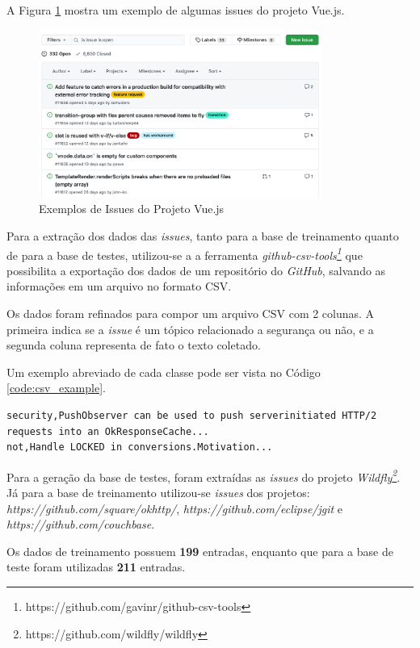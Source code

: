 \documentclass[conference]{IEEEtran}
\begin{document}
A Figura \ref{fig:issues_example} mostra um exemplo de algumas issues do projeto Vue.js.

\begin{figure}[htbp]
    \centerline{\includegraphics[width=25em]{images/issues_example.png}}
    \caption{Exemplos de Issues do Projeto Vue.js}
    \label{fig:issues_example}
\end{figure}

Para a extração dos dados das \textit{issues}, tanto para a base de treinamento quanto de para a base de testes, utilizou-se a a ferramenta \textit{github-csv-tools\footnote{https://github.com/gavinr/github-csv-tools}} que possibilita a exportação dos dados de um repositório do \textit{GitHub}, salvando as informações em um arquivo no formato CSV.

Os dados foram refinados para compor um arquivo CSV com 2 colunas. A primeira  indica se a \textit{issue} é um tópico relacionado a segurança ou não, e a segunda coluna representa de fato o texto coletado.

Um exemplo abreviado de cada classe pode ser vista no Código \ref{code:csv_example}.

\begin{lstlisting}[caption={CSV Exemplo com Base de Dados},captionpos=b,frame=single,label={code:csv_example}]
security,PushObserver can be used to push serverinitiated HTTP/2 requests into an OkResponseCache...
not,Handle LOCKED in conversions.Motivation...
\end{lstlisting}

Para a geração da base de testes, foram extraídas as \textit{issues} do projeto \textit{Wildfly\footnote{https://github.com/wildfly/wildfly}}. Já para a base de treinamento utilizou-se \textit{issues} dos projetos: \textit{https://github.com/square/okhttp/}, \textit{https://github.com/eclipse/jgit} e \textit{https://github.com/couchbase}.

Os dados de treinamento possuem \textbf{199} entradas, enquanto que para a base de teste foram utilizadas \textbf{211} entradas.
\end{document}

